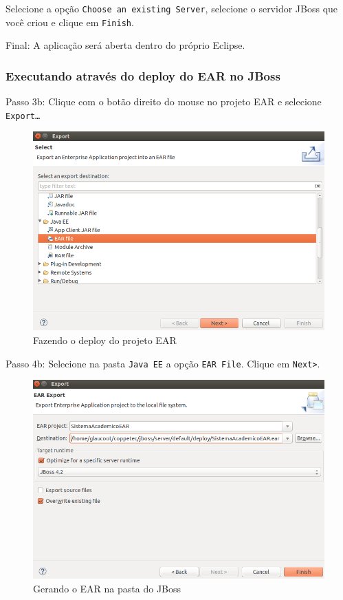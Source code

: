 Selecione a opção \texttt{Choose an existing Server}, selecione o servidor JBoss que você criou e clique em \texttt{Finish}.

Final: A aplicação será aberta dentro do próprio Eclipse.

\subsubsection{Executando através do deploy do EAR no JBoss}

Passo 3b: Clique com o botão direito do mouse no projeto EAR e selecione \texttt{Export\ldots}

\begin{figure}[H]
	\centering
	\includegraphics[scale=0.5]{files/imgs/gwt-14.png}
	\caption{Fazendo o deploy do projeto EAR}
	\label{gwt14}
\end{figure}

Passo 4b: Selecione na pasta \texttt{Java EE} a opção \texttt{EAR File}. Clique em \texttt{Next>}.

\begin{figure}[H]
	\centering
	\includegraphics[scale=0.5]{files/imgs/gwt-15.png}
	\caption{Gerando o EAR na pasta do JBoss}
	\label{gwt15}
\end{figure}

